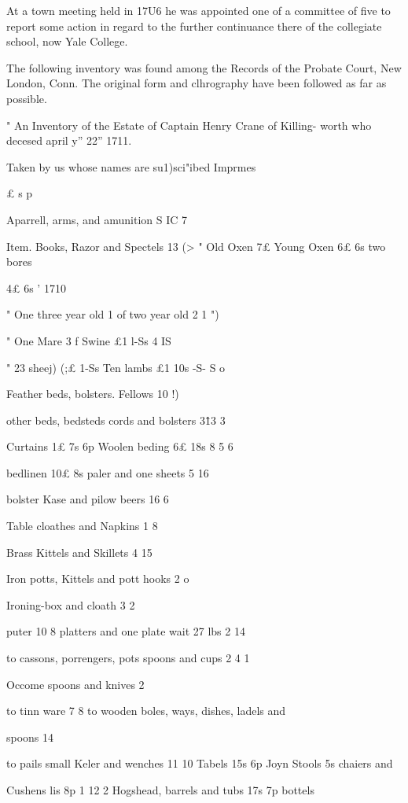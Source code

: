 \documentclass{book}
\begin{document}
At a town meeting held in 17U6 he was appointed one of a 
committee of five to report some action in regard to the further 
continuance there of the collegiate school, now Yale College. 

The following inventory was found among the Records of the 
Probate Court, New London, Conn. The original form and 
clhrography have been followed as far as possible. 

" An Inventory of the Estate of Captain Henry Crane of Killing- 
worth who decesed april y'' 22'' 1711. 

Taken by us whose names are su1)sci"ibed 
Imprmes 

£ s p 

Aparrell, arms, and amunition S  IC  7 

Item. Books, Razor and Spectels  13  (> 
" Old Oxen 7£ Young Oxen 6£  6s two bores 

4£ 6s ' 1710 

" One three year old 1 of two year old 2  1 ")  

" One Mare 3 f Swine £1  l-Ss 4  IS  

" 23 sheej) (;£ 1-Ss Ten lambs £1 10s -S- S o 

Feather beds, bolsters. Fellows 10  !)  

other beds, bedsteds cords and bolsters 3\^13  3 




Curtains 1£ 7s 6p Woolen beding 6£ 18s 8 5 6 

bedlinen 10£  8s paler and one sheets 5  16  

bolster Kase and pilow beers  16  6 

Table cloathes and Napkins 1  8  

Brass Kittels and Skillets 4  15  

Iron potts, Kittels and pott hooks 2  o  

Ironing-box and cloath  3  2 

puter 10  8 platters and one plate wait 27 lbs 2  14  

to cassons, porrengers, pots spoons and cups 2  4  1 

Occome spoons and knives  2  

to tinn ware  7  8 
to wooden boles, ways, dishes, ladels and 

spoons  14  

to pails small Keler and wenches  11  10 
Tabels 15s  6p Joyn Stools 5s chaiers and 

Cushens lis  8p 1  12  2 
Hogshead, barrels and tubs 17s  7p bottels 
\end{document}
